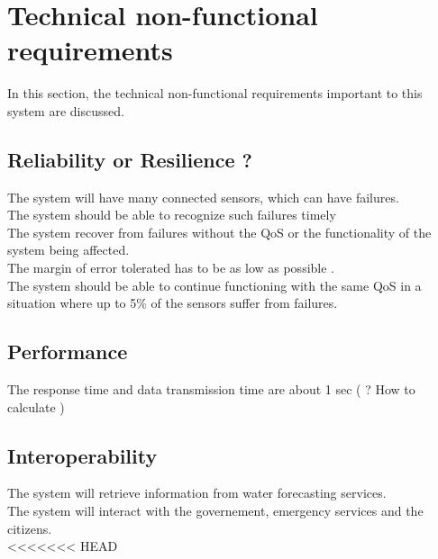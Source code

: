 \section{Technical non-functional requirements}
In this section, the technical non-functional requirements important to this system are discussed.

\subsection{Reliability or Resilience ? }

The system will have many connected sensors, which can have failures. \\
The system should be able to recognize such failures timely \\
The system recover from failures without the QoS or the functionality of the system being affected. \\
The margin of error tolerated has to be as low as possible .\\
The system should be able to continue functioning with the same QoS in a situation where up to 5\% of the sensors suffer from failures. \\ %

\subsection{Performance}
The response time and data transmission time are about 1 sec ( ? How to calculate ) \\


\subsection{Interoperability}
The system will retrieve information from water forecasting services.\\ 
The system will interact with the governement, emergency services and the citizens.\\

<<<<<<< HEAD


